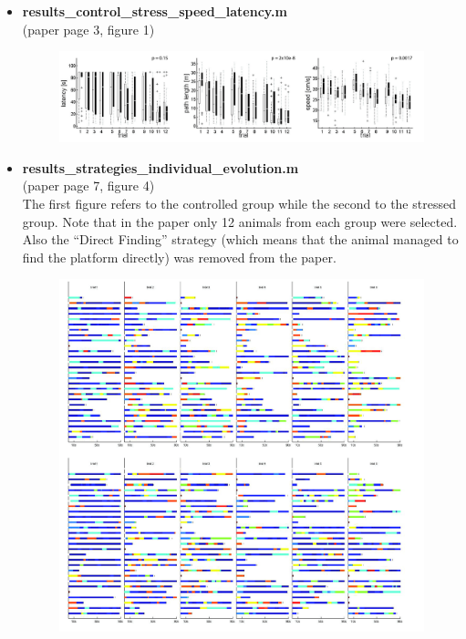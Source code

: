 \documentclass[12pt,titlepage]{article}
\begin{document}
\begin{doublespace}
\begin{itemize}
\item \textbf{results\_control\_stress\_speed\_latency.m}\\
(paper page 3, figure 1)
\begin{figure}[H]
	\begin{center}
		\includegraphics[width=1\textwidth]{f1.jpg}\\
		\label{code_fig1}
	\end{center}
\end{figure}
\item \textbf{results\_strategies\_individual\_evolution.m}\\
(paper page 7, figure 4)\\
The first figure refers to the controlled group while the second to the stressed group. Note that in the paper only 12 animals from each group were selected. Also the ``Direct Finding'' strategy (which means that the animal managed to find the platform directly) was removed from the paper.
\begin{figure}[H]
	\begin{center}
		\includegraphics[width=1\textwidth]{f4.jpg}\\

\end{center}
\end{figure}
\end{itemize}
\end{doublespace}
\end{document}
